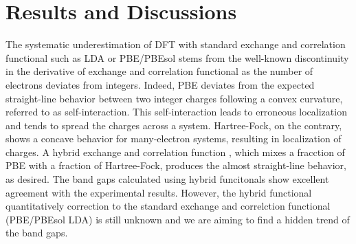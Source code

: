 \documentclass[twocolumn,
superscriptaddress,
 amsmath,amssymb,
 aps, citeautoscript,
prb,
]{revtex4-1}
\begin{document}
\section{Results and Discussions}




The systematic underestimation of DFT with standard exchange and correlation functional such as LDA or PBE/PBEsol stems from the well-known discontinuity in the derivative of exchange and correlation functional as the number of electrons deviates from integers. Indeed, PBE deviates from the expected straight-line behavior between two integer charges following a convex curvature, referred to as self-interaction. This self-interaction leads to erroneous localization and tends to spread the charges across a system. Hartree-Fock, on the contrary, shows a concave behavior for many-electron systems, resulting in localization of charges. A hybrid exchange and correlation function , which mixes a fracction of PBE with a fraction of Hartree-Fock, produces the almost straight-line behavior, as desired. The band gaps calculated using hybrid funcitonals show excellent agreement with the experimental results. However, the hybrid functional quantitatively correction to the standard exchange and correlction functional (PBE/PBEsol LDA) is still unknown and we are aiming to find a hidden trend of the band gaps.
\end{document}
